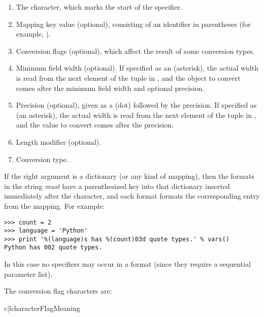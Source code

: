 \begin{enumerate}
  \item  The \character{\%} character, which marks the start of the
         specifier.
  \item  Mapping key value (optional), consisting of an identifier in
         parentheses (for example, ).
  \item  Conversion flags (optional), which affect the result of some
         conversion types.
  \item  Minimum field width (optional).  If specified as an
         \character{*} (asterisk), the actual width is read from the
         next element of the tuple in , and the object to
         convert comes after the minimum field width and optional
         precision.
  \item  Precision (optional), given as a  (dot) followed
         by the precision.  If specified as \character{*} (an
         asterisk), the actual width is read from the next element of
         the tuple in , and the value to convert comes after
         the precision.
  \item  Length modifier (optional).
  \item  Conversion type.
\end{enumerate}

If the right argument is a dictionary (or any kind of mapping), then
the formats in the string \emph{must} have a parenthesized key into
that dictionary inserted immediately after the \character{\%}
character, and each format formats the corresponding entry from the
mapping.  For example:

\begin{verbatim}
>>> count = 2
>>> language = 'Python'
>>> print '%(language)s has %(count)03d quote types.' % vars()
Python has 002 quote types.
\end{verbatim}

In this case no \code{*} specifiers may occur in a format (since they
require a sequential parameter list).

The conversion flag characters are:

\begin{tableii}{c|l}{character}{Flag}{Meaning}
\end{tableii}

